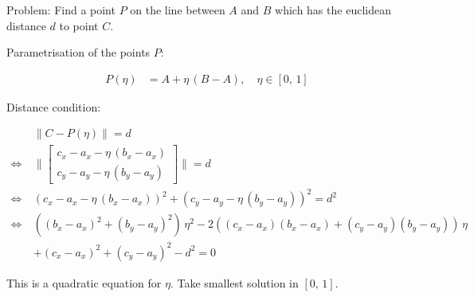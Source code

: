 Problem: Find a point $P$ on the line between $A$ and $B$ which has the euclidean distance $d$ to point $C$.

Parametrisation of the points $P$:

\begin{align*}
P(\eta) &= A + \eta\,(B-A),\quad \eta \in [0,\,1]
\end{align*}

Distance condition:

\begin{align*}
&\lVert C - P(\eta)\rVert = d\\
\Leftrightarrow\:&\lVert
\begin{bmatrix}
c_x - a_x - \eta\,(b_x - a_x) \\ c_y - a_y - \eta\,(b_y - a_y)
\end{bmatrix}
\rVert = d\\
\Leftrightarrow\:&\left(c_x - a_x - \eta\,(b_x - a_x)\right)^2 + \left(c_y - a_y - \eta\,(b_y - a_y)\right)^2 = d^2\\
\Leftrightarrow\:&\left((b_x - a_x)^2 + (b_y - a_y)^2\right)\,\eta^2-2\left((c_x - a_x)(b_x - a_x) + (c_y - a_y)(b_y - a_y)\right)\,\eta\\
&+(c_x - a_x)^2 + (c_y - a_y)^2 - d^2 = 0
\end{align*}

This is a quadratic equation for $\eta$. Take smallest solution in $[0,\,1]$.
